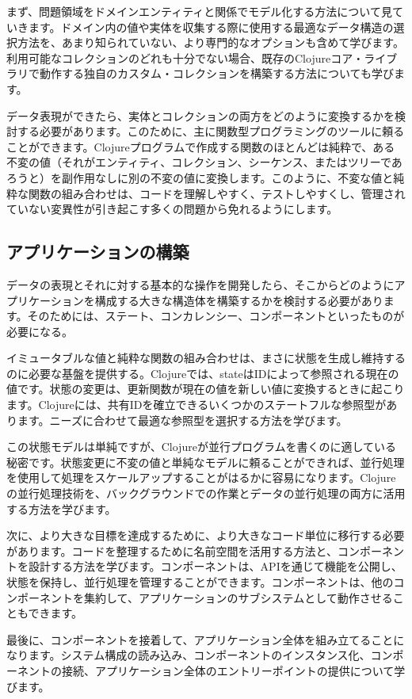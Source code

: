 まず、問題領域をドメインエンティティと関係でモデル化する方法について見ていきます。ドメイン内の値や実体を収集する際に使用する最適なデータ構造の選択方法を、あまり知られていない、より専門的なオプションも含めて学びます。利用可能なコレクションのどれも十分でない場合、既存のClojureコア・ライブラリで動作する独自のカスタム・コレクションを構築する方法についても学びます。

データ表現ができたら、実体とコレクションの両方をどのように変換するかを検討する必要があります。このために、主に関数型プログラミングのツールに頼ることができます。Clojureプログラムで作成する関数のほとんどは純粋で、ある不変の値（それがエンティティ、コレクション、シーケンス、またはツリーであろうと）を副作用なしに別の不変の値に変換します。このように、不変な値と純粋な関数の組み合わせは、コードを理解しやすく、テストしやすくし、管理されていない変異性が引き起こす多くの問題から免れるようにします。


\subsection{アプリケーションの構築}

データの表現とそれに対する基本的な操作を開発したら、そこからどのようにアプリケーションを構成する大きな構造体を構築するかを検討する必要があります。そのためには、ステート、コンカレンシー、コンポーネントといったものが必要になる。

イミュータブルな値と純粋な関数の組み合わせは、まさに状態を生成し維持するのに必要な基盤を提供する。Clojureでは、stateはIDによって参照される現在の値です。状態の変更は、更新関数が現在の値を新しい値に変換するときに起こります。Clojureには、共有IDを確立できるいくつかのステートフルな参照型があります。ニーズに合わせて最適な参照型を選択する方法を学びます。

この状態モデルは単純ですが、Clojureが並行プログラムを書くのに適している秘密です。状態変更に不変の値と単純なモデルに頼ることができれば、並行処理を使用して処理をスケールアップすることがはるかに容易になります。Clojureの並行処理技術を、バックグラウンドでの作業とデータの並行処理の両方に活用する方法を学びます。

次に、より大きな目標を達成するために、より大きなコード単位に移行する必要があります。コードを整理するために名前空間を活用する方法と、コンポーネントを設計する方法を学びます。コンポーネントは、APIを通じて機能を公開し、状態を保持し、並行処理を管理することができます。コンポーネントは、他のコンポーネントを集約して、アプリケーションのサブシステムとして動作させることもできます。

最後に、コンポーネントを接着して、アプリケーション全体を組み立てることになります。システム構成の読み込み、コンポーネントのインスタンス化、コンポーネントの接続、アプリケーション全体のエントリーポイントの提供について学びます。

